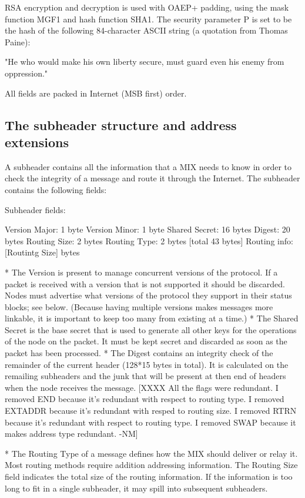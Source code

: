 RSA encryption and decryption is used with OAEP+ padding, using the 
mask function MGF1 and hash function SHA1.  The security
parameter P is set to be the hash of the following 84-character ASCII
string (a quotation from Thomas Paine): 

     "He who would make his own liberty secure, must guard even his
      enemy from oppression." 

All fields are packed in Internet (MSB first) order.

\subsection{The subheader structure and address extensions}

A subheader contains all the information that a MIX needs to know
in order to check the integrity of a message and route it through the
Internet. The subheader contains the following fields: 

Subheader fields:

Version Major:   1 byte
Version Minor:   1 byte
Shared Secret:   16 bytes
Digest:          20 bytes
Routing Size:    2 bytes
Routing Type:    2 bytes  [total 43 bytes]
Routing info:    [Routintg Size] bytes

* The Version is present to manage concurrent versions of the
protocol. If a packet is received with a version that is not supported
it should be discarded. Nodes must advertise what versions of the
protocol they support in their status blocks; see below.
(Because having multiple versions makes messages more linkable, it is
important to keep too many from existing at a time.)
* The Shared Secret is the base secret that is used to generate all
other keys for the operations of the node on the packet. It must be
kept secret and discarded as soon as the packet has been processed. 
* The Digest contains an integrity check of the remainder of the
current header (128*15 bytes in total).  It is calculated on the
remailing subheaders and the junk that will be present at then end 
of headers when the node receives the message. 
   [XXXX All the flags were redundant. 
    I removed END because it's redundant with respect to routing type.
    I removed EXTADDR because it's redundant with resped to routing
      size.
    I removed RTRN because it's redundant with respect to routing
       type.
    I removed SWAP because it makes address type redundant.   -NM]

* The Routing Type of a message defines how the MIX should deliver or
  relay it.  Most routing methods require addition addressing information.
  The Routing Size field indicates the total size of the routing
  information.   If the information is too long to fit in a single
  subheader, it may spill into subsequent subheaders.

